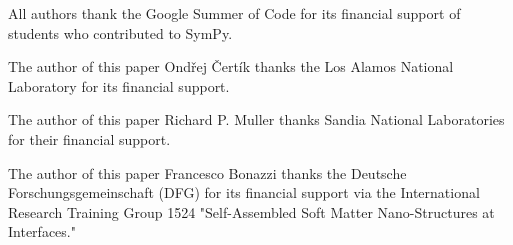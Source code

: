 All authors thank the Google Summer of Code for its financial support of
students who contributed to SymPy.

The author of this paper Ondřej Čertík thanks the Los Alamos National
Laboratory for its financial support.

The author of this paper Richard P. Muller thanks Sandia National Laboratories
for their financial support.

The author of this paper Francesco Bonazzi thanks the Deutsche
Forschungsgemeinschaft (DFG) for its financial support via the International
Research Training Group 1524 "Self-Assembled Soft Matter Nano-Structures at
Interfaces."
